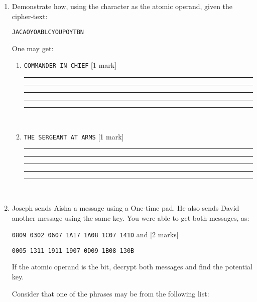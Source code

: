 \documentclass[12pt,emtex]{article}
\begin{document}
\begin{enumerate}
 \item Demonstrate how, using the character as the atomic operand, given the cipher-text:
 
\texttt{JACAOYOABLCYOUPOYTBN}
 
 One may get:
 
 
\begin{enumerate}
\item \texttt{COMMANDER IN CHIEF} 	 \hfill [1 mark]

\bigskip

\vspace{8mm}

\hrule \vspace{8mm}   \hrule \vspace{8mm}    
\hrule \vspace{8mm}   \hrule \vspace{8mm}   \hrule 
\

\item \texttt{THE SERGEANT AT ARMS}		\hfill [1 mark]

\vspace{12mm}

\hrule \vspace{8mm}   \hrule \vspace{8mm}    
\hrule \vspace{8mm}   \hrule \vspace{8mm}   \hrule 



\end{enumerate}

\newpage

\

\vspace{-20mm}

\item Joseph sends Aisha a message using a One-time pad. He also sends David another message using the same key. You were able to get both messages, as:


\texttt{0809 0302 0607 1A17 1A08 1C07 141D}
	and
	 	 \hfill [2 marks]
	
\texttt{0005 1311 1911 1907 0D09 1B08 130B}

 
  If the atomic operand is the bit, decrypt both messages and find the potential key.

Consider that one of the phrases may be from the following list: 

\


\end{enumerate}
\end{document}
